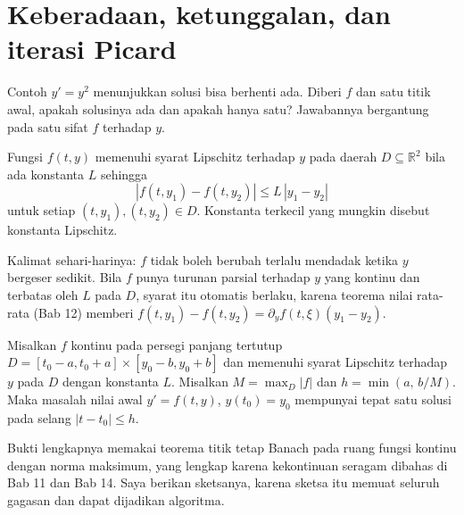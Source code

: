 
\section{Keberadaan, ketunggalan, dan iterasi Picard}

Contoh $y'=y^{2}$ menunjukkan solusi bisa berhenti ada. Diberi $f$ dan satu titik
awal, apakah solusinya ada dan apakah hanya satu? Jawabannya bergantung pada satu
sifat $f$ terhadap $y$.

\begin{definisi}
Fungsi $f(t,y)$ memenuhi syarat Lipschitz terhadap $y$ pada daerah
$D\subseteq\mathbb{R}^{2}$ bila ada konstanta $L$ sehingga
\[
|f(t,y_{1})-f(t,y_{2})|\le L\,|y_{1}-y_{2}|
\]
untuk setiap $(t,y_{1}),(t,y_{2})\in D$. Konstanta terkecil yang mungkin disebut
konstanta Lipschitz.
\end{definisi}

Kalimat sehari-harinya: $f$ tidak boleh berubah terlalu mendadak ketika $y$
bergeser sedikit. Bila $f$ punya turunan parsial terhadap $y$ yang kontinu dan
terbatas oleh $L$ pada $D$, syarat itu otomatis berlaku, karena teorema nilai
rata-rata (Bab 12) memberi
$f(t,y_{1})-f(t,y_{2})=\partial_{y}f(t,\xi)(y_{1}-y_{2})$.

\begin{teorema}
Misalkan $f$ kontinu pada persegi panjang tertutup
$D=[t_{0}-a,t_{0}+a]\times[y_{0}-b,y_{0}+b]$ dan memenuhi syarat Lipschitz
terhadap $y$ pada $D$ dengan konstanta $L$. Misalkan $M=\max_{D}|f|$ dan
$h=\min(a,\,b/M)$. Maka masalah nilai awal $y'=f(t,y)$, $y(t_{0})=y_{0}$
mempunyai tepat satu solusi pada selang $|t-t_{0}|\le h$.
\end{teorema}

Bukti lengkapnya memakai teorema titik tetap Banach pada ruang fungsi kontinu
dengan norma maksimum, yang lengkap karena kekontinuan seragam dibahas di Bab 11
dan Bab 14. Saya berikan sketsanya, karena sketsa itu memuat seluruh gagasan dan
dapat dijadikan algoritma.

